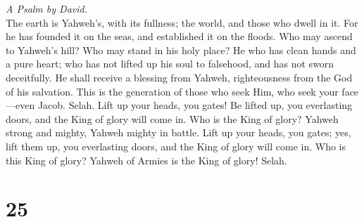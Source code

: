 \emph{A Psalm by David.}\\
 The earth is Yahweh's, with its fullness; the world, and
those who dwell in it.  For he has founded it on the seas,
and established it on the floods.  Who may ascend to
Yahweh's hill? Who may stand in his holy place?  He who
has clean hands and a pure heart; who has not lifted up his soul to
falsehood, and has not sworn deceitfully.  He shall
receive a blessing from Yahweh, righteousness from the God of his
salvation.  This is the generation of those who seek Him,
who seek your face---even Jacob. Selah.  Lift up your
heads, you gates! Be lifted up, you everlasting doors, and the King of
glory will come in.  Who is the King of glory? Yahweh
strong and mighty, Yahweh mighty in battle.  Lift up your
heads, you gates; yes, lift them up, you everlasting doors, and the King
of glory will come in.  Who is this King of glory? Yahweh
of Armies is the King of glory! Selah.

\hypertarget{section-24}{%
\section{25}\label{section-24}}

